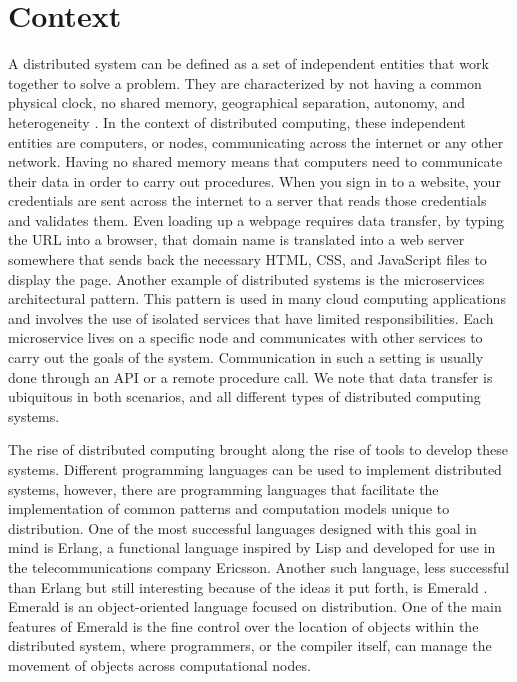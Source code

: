 
\chapter{Context}
\label{cha:context}


A distributed system can be defined as a set of independent entities that work together to solve a problem. They are characterized by not having a common physical clock, no shared memory, geographical separation, autonomy, and heterogeneity \cite{alma991001697099707681}.
In the context of distributed computing, these independent entities are computers, or nodes, communicating across the internet or any other network. Having no shared memory means that computers need to communicate their data in order to carry out procedures. When you sign in to a website, your credentials are sent across the internet to a server that reads those credentials and validates them. Even loading up a webpage requires data transfer, by typing the URL into a browser, that domain name is translated into a web server somewhere that sends back the necessary HTML, CSS, and JavaScript files to display the page. Another example of distributed systems is the microservices architectural pattern. This pattern is used in many cloud computing applications and involves the use of isolated services that have limited responsibilities. Each microservice lives on a specific node and communicates with other services to carry out the goals of the system. Communication in such a setting is usually done through an API or a remote procedure call. We note that data transfer is ubiquitous in both scenarios, and all different types of distributed computing systems.

The rise of distributed computing brought along the rise of tools to develop these systems.
Different programming languages can be used to implement distributed systems, however, there are programming languages that facilitate the implementation of common patterns and computation models unique to distribution. One of the most successful languages designed with this goal in mind is Erlang, a functional language inspired by Lisp and developed for use in the telecommunications company Ericsson. Another such language, less successful than Erlang but still interesting because of the ideas it put forth, is Emerald \cite{BlackAndrew2007Tdot}. Emerald is an object-oriented language focused on distribution. One of the main features of Emerald is the fine control over the location of objects within the distributed system, where programmers, or the compiler itself, can manage the movement of objects across computational nodes.

